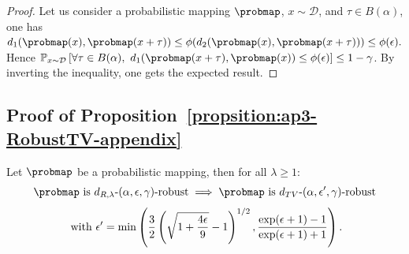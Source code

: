 \begin{proof}
Let us consider a probabilistic mapping $\probmap$, $x \sim \mathcal{D}$, and $\tau \in B(\alpha)$, one has $d_{1}(\probmap(x),\probmap(x +\tau)) \leq \phi(d_{2}(\probmap(x),\probmap(x +\tau))) \leq \phi(\epsilon).$ Hence  $\mathbb{P}_{x\sim\mathcal{D}}\left[ \forall \tau \in B(\alpha),\ d_1(\probmap(x+\tau),\probmap(x)) \leq \phi(\epsilon) \right] \leq 1-\gamma$. By inverting the inequality, one gets the expected result.
\end{proof}

\subsection{Proof of Proposition~\ref{propsition:ap3-RobustTV-appendix}}


\begin{proposition}
\label{propsition:ap3-RobustTV-appendix}
Let $\probmap$ be a probabilistic mapping, then for all $\lambda\geq1$:
$$\probmap \text{ is }  d_{R,\lambda}\text{-}(\alpha, \epsilon, \gamma)\text{-robust} \implies \probmap \text{ is } d_{TV}\text{-}(\alpha, \epsilon', \gamma)\text{-robust}$$
$$\textnormal{ with } \epsilon' = \min \left(\frac{3}{2}\left(\sqrt{1 + \frac{4\epsilon}{9}} - 1\right)^{1/2}, \frac{\exp(\epsilon +1) -1}{\exp(\epsilon +1) +1}\right).$$


\end{proposition}


